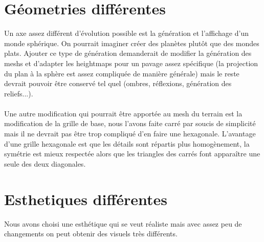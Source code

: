 \documentclass{EPUProjetDi}
\begin{document}
\section{Géometries différentes}

Un axe assez différent d'évolution possible est la génération et l'affichage d'un monde sphérique. On pourrait imaginer créer des planètes plutôt que des mondes plats. Ajouter ce type de génération demanderait de modifier la génération des meshs et d'adapter les heightmaps pour un pavage assez spécifique (la projection du plan à la sphère est assez compliquée de manière générale) mais le reste devrait pouvoir être conservé tel quel (ombres, réflexions, génération des reliefs...).

\paragraph{}
Une autre modification qui pourrait être apportée au mesh du terrain est la modification de la grille de base, nous l'avons faite carré par soucis de simplicité mais il ne devrait pas être trop compliqué d'en faire une hexagonale. L'avantage d'une grille hexagonale est que les détails sont répartis plus homogènement, la symétrie est mieux respectée alors que les triangles des carrés font apparaître une seule des deux diagonales.

\section{Esthetiques différentes}

Nous avons choisi une esthétique qui se veut réaliste mais avec assez peu de changements on peut obtenir des visuels très différents.
\end{document}
